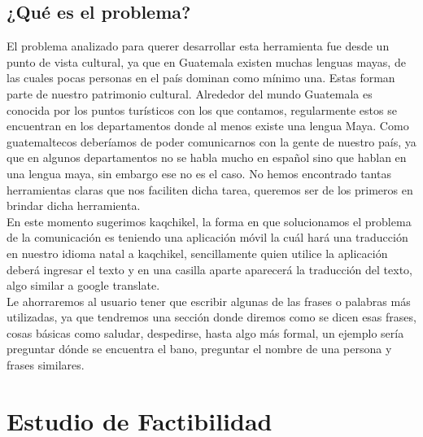 \documentclass[a4paper,openright,12pt]{article}
\begin{document}
\subsection{¿Qu\'e es el problema?}
El problema analizado para querer desarrollar esta herramienta fue desde un punto de vista cultural, ya que en Guatemala existen muchas lenguas mayas, de las cuales pocas personas en el pa\'is dominan como m\'inimo una. Estas forman parte de nuestro patrimonio cultural. Alrededor del mundo Guatemala es conocida por los puntos tur\'isticos con los que contamos, regularmente estos se encuentran en los departamentos donde al menos existe una lengua Maya.  Como guatemaltecos deber\'iamos de poder comunicarnos con la gente de nuestro pa\'is, ya que en algunos departamentos no se habla mucho en espa\~nol sino que hablan en una lengua maya, sin embargo ese no es el caso. No hemos encontrado tantas herramientas claras que nos faciliten dicha tarea, queremos ser de los primeros en brindar dicha herramienta.\\

En este momento sugerimos kaqchikel, la forma en que solucionamos el problema de la comunicación es teniendo una aplicación m\'ovil la cu\'al har\'a una traducción en nuestro idioma natal a kaqchikel, sencillamente quien utilice la aplicación deberá ingresar el texto y en una casilla aparte aparecer\'a la traducci\'on del texto, algo similar a google translate.\\

Le ahorraremos al usuario tener que escribir algunas de las frases o palabras m\'as utilizadas, ya que tendremos una secci\'on donde diremos como se dicen esas frases, cosas b\'asicas como saludar, despedirse, hasta algo m\'as formal, un ejemplo ser\'ia preguntar d\'onde se encuentra el bano, preguntar el nombre de una persona y frases similares.\\
\newpage

\section{Estudio de Factibilidad}
\end{document}
